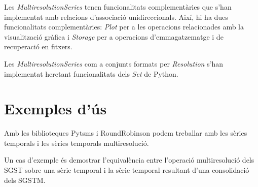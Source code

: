 Les \emph{MultiresolutionSeries} tenen funcionalitats complementàries
que s'han implementat amb relacions d'associació
unidireccionals. Així, hi ha dues funcionalitats complementàries:
\emph{Plot} per a les operacions relacionades amb la visualització
gràfica i \emph{Storage} per a operacions d'emmagatzematge i de
recuperació en fitxers.



Les \emph{MultiresolutionSeries} com a conjunts formats per
\emph{Resolution} s'han implementat heretant funcionalitats dels
\emph{Set} de Python.




\section{Exemples d'ús}


\todo{}


Amb les biblioteques Pytsms i RoundRobinson podem treballar amb les sèries temporals i les sèries temporals multiresolució. 

Un cas d'exemple és demostrar l'equivalència entre l'operació multiresolució dels SGST sobre una sèrie temporal i la sèrie temporal resultant d'una consolidació dels SGSTM. 












